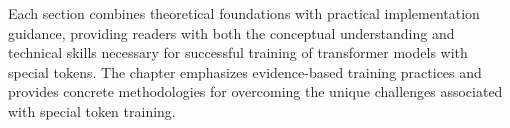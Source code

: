 Each section combines theoretical foundations with practical implementation guidance, providing readers with both the conceptual understanding and technical skills necessary for successful training of transformer models with special tokens. The chapter emphasizes evidence-based training practices and provides concrete methodologies for overcoming the unique challenges associated with special token training.